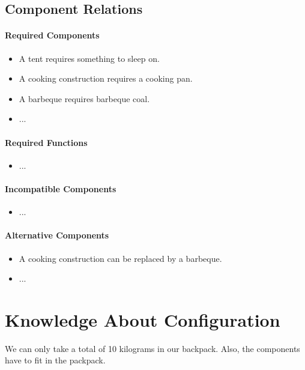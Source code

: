 \documentclass[a4paper,11pt]{article}
\begin{document}
\subsection*{Component Relations}

\paragraph{Required Components}

\begin{itemize}
\item A tent requires something to sleep on.
\item A cooking construction requires a cooking pan.
\item A barbeque requires barbeque coal.
\item ...
\end{itemize}

\paragraph{Required Functions}

\begin{itemize}
\item ...
\end{itemize}

\paragraph{Incompatible Components}

\begin{itemize}
\item ...
\end{itemize}

\paragraph{Alternative Components}

\begin{itemize}
\item A cooking construction can be replaced by a barbeque.
\item ...
\end{itemize}


\section*{Knowledge About Configuration}

We can only take a total of 10 kilograms in our backpack.
Also, the components have to fit in the packpack.
\end{document}
